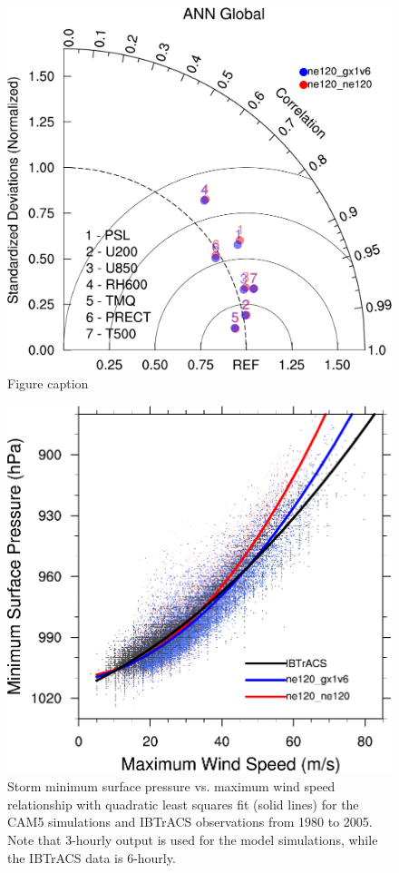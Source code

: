 \documentclass[draft,ms]{AGUTeX}
\begin{document}
\begin{figure}
\includegraphics[width=0.7\linewidth]{fig_taylor_globe_ANN.pdf}
\caption{Figure caption}
\label{fig:taylor_global}
\end{figure}

\begin{figure}
\includegraphics[width=0.8\linewidth]{fig_preswind.pdf}
\caption{Storm minimum surface pressure vs. maximum wind speed relationship with quadratic least squares fit (solid lines) for the CAM5 simulations and IBTrACS observations from 1980 to 2005.  Note that 3-hourly output is used for the model simulations, while the IBTrACS data is 6-hourly.}
\label{fig:preswind}
\end{figure}
\end{document}
